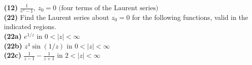 \documentclass[12pt,letterpaper]{article}
\begin{document}
\textbf{(12)} \(\frac{1}{e^{z}-1},\ z_{0} = 0 \text{ (four terms of the Laurent series)}\) \\



\textbf{(22)} Find the Laurent series about \(z_{0} = 0\) for the following functions, valid in the indicated regions. \\

\textbf{(22a)} \(e^{1/z}\) in \(0 < |z| < \infty\) \\



\textbf{(22b)} \(z^{4}\sin(1/z)\) in \(0 < |z| < \infty\) \\



\textbf{(22c)} \(\frac{1}{z-1} - \frac{1}{z+1}\) in \(2 < |z| < \infty\) \\
\end{document}
